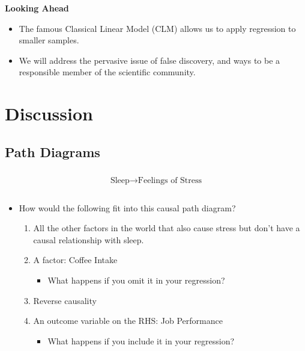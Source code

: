\documentclass[
  letterpaper,
  DIV=11,
  numbers=noendperiod]{scrreprt}
\providecommand{\tightlist}{%
  \setlength{\itemsep}{0pt}\setlength{\parskip}{0pt}}\usepackage{longtable,booktabs,array}
\begin{document}
\textbf{Looking Ahead}

\begin{itemize}
\tightlist
\item
  The famous Classical Linear Model (CLM) allows us to apply regression
  to smaller samples.
\item
  We will address the pervasive issue of false discovery, and ways to be
  a responsible member of the scientific community.
\end{itemize}

\section{Discussion}\label{discussion-1}

\subsection{Path Diagrams}\label{path-diagrams}

\[
\begin{matrix}
\\
\text{Sleep} \rightarrow \text{Feelings of Stress} \\
\\
\end{matrix}
\]

\begin{itemize}
\tightlist
\item
  How would the following fit into this causal path diagram?

  \begin{enumerate}
  \def\labelenumi{\arabic{enumi}.}
  \tightlist
  \item
    All the other factors in the world that also cause stress but don't
    have a causal relationship with sleep.
  \item
    A factor: Coffee Intake

    \begin{itemize}
    \tightlist
    \item
      What happens if you omit it in your regression?
    \end{itemize}
  \item
    Reverse causality
  \item
    An outcome variable on the RHS: Job Performance

    \begin{itemize}
    \tightlist
    \item
      What happens if you include it in your regression?
    \end{itemize}
  \end{enumerate}
\end{itemize}
\end{document}
